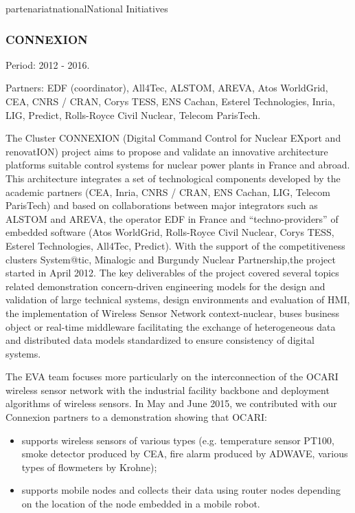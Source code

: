 \documentclass{ra2016}
\begin{document}
\begin{module}{partenariat}{national}{National Initiatives}
\subsubsection{CONNEXION}

\begin{participants}
\end{participants}

Period: 2012 - 2016.

Partners: EDF (coordinator), All4Tec, ALSTOM, AREVA, Atos WorldGrid, CEA, CNRS / CRAN, Corys TESS, ENS Cachan, Esterel Technologies, Inria, LIG, Predict, Rolls-Royce Civil Nuclear, Telecom ParisTech.

The Cluster CONNEXION (Digital Command Control for Nuclear EXport and renovatION) project aims to propose and validate an innovative architecture platforms suitable control systems for nuclear power plants in France and abroad. This architecture integrates a set of technological components developed by the academic partners (CEA, Inria, CNRS / CRAN, ENS Cachan, LIG, Telecom ParisTech) and based on collaborations between major integrators such as ALSTOM and AREVA, the operator EDF in France and ``techno-providers'' of embedded software (Atos WorldGrid, Rolls-Royce Civil Nuclear, Corys TESS, Esterel Technologies, All4Tec, Predict).
With the support of the competitiveness clusters System@tic, Minalogic and Burgundy Nuclear Partnership,the project started in April 2012. The key deliverables of the project covered several topics related demonstration concern-driven engineering models for the design and validation of large technical systems, design environments and evaluation of HMI, the implementation of Wireless Sensor Network context-nuclear, buses business object or real-time middleware facilitating the exchange of heterogeneous data and distributed data models standardized to ensure consistency of digital systems. 

The EVA team focuses more particularly on the interconnection of the OCARI wireless sensor network with the industrial facility backbone and deployment algorithms of wireless sensors.
In May and June 2015, we contributed with our Connexion partners to a demonstration showing that OCARI:

\begin{itemize}
    \item supports wireless sensors of various types (e.g. temperature sensor PT100, smoke detector produced by CEA, fire alarm produced by ADWAVE, various types of flowmeters by Krohne);
    \item supports mobile nodes and collects their data using router nodes depending on the location of the node embedded in a mobile robot.
\end{itemize}


\end{module}
\end{document}
